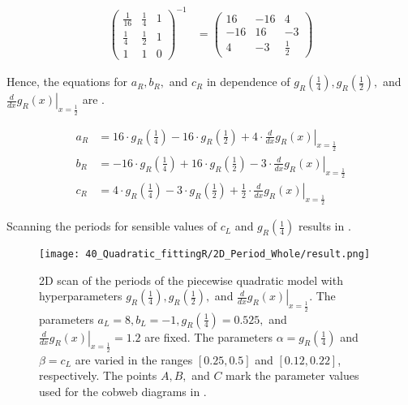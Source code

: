 \begin{align}
	\begin{pmatrix}
		\frac{1}{16} & \frac{1}{4} & 1 \\
		\frac{1}{4}  & \frac{1}{2} & 1 \\
		1            & 1           & 0
	\end{pmatrix}^{-1} & =
	\begin{pmatrix}
		16  & -16 & 4           \\
		-16 & 16  & -3          \\
		4   & -3  & \frac{1}{2}
	\end{pmatrix}
	\label{equ:setup.quad.hyper.matrix}
\end{align}

Hence, the equations for $a_R, b_R,$ and $c_R$ in dependence of $g_R\left(\frac{1}{4}\right), g_R\left(\frac{1}{2}\right),$ and $\left. \frac{d}{dx} g_R\left(x\right) \right|_{x = \frac{1}{2}}$ are .

\begin{align}
	a_R & = 16 \cdot g_R\left(\frac{1}{4}\right) - 16 \cdot g_R\left(\frac{1}{2}\right) + 4 \cdot \left. \frac{d}{dx} g_R\left(x\right) \right|_{x = \frac{1}{2}}     \label{equ:setup.quad.hyper.aR}     \\
	b_R & = -16 \cdot g_R\left(\frac{1}{4}\right) + 16 \cdot g_R\left(\frac{1}{2}\right) - 3 \cdot \left. \frac{d}{dx} g_R\left(x\right) \right|_{x = \frac{1}{2}} \label{equ:setup.quad.hyper.bR}        \\
	c_R & = 4 \cdot g_R\left(\frac{1}{4}\right) - 3 \cdot g_R\left(\frac{1}{2}\right) + \frac{1}{2} \cdot \left. \frac{d}{dx} g_R\left(x\right) \right|_{x = \frac{1}{2}} \label{equ:setup.quad.hyper.cR}
\end{align}

Scanning the periods for sensible values of $c_L$ and $g_R\left(\frac{1}{4}\right)$ results in .

\begin{figure}
	\centering
	\texttt{[image: 40\_Quadratic\_fittingR/2D\_Period\_Whole/result.png]}
	\caption[2D scan of the periods of the quadratic model with hyperparameters]{
	2D scan of the periods of the piecewise quadratic model with hyperparameters $g_R\left(\frac{1}{4}\right), g_R\left(\frac{1}{2}\right),$ and $\left. \frac{d}{dx} g_R\left(x\right) \right|_{x = \frac{1}{2}}$.
	The parameters $a_L = 8, b_L = -1, g_R\left(\frac{1}{4}\right) = 0.525,$ and $\left. \frac{d}{dx} g_R\left(x\right) \right|_{x = \frac{1}{2}} = 1.2$ are fixed.
	The parameters $\alpha = g_R\left(\frac{1}{4}\right)$ and $\beta = c_L$ are varied in the ranges $[0.25, 0.5]$ and $[0.12, 0.22]$, respectively.
	The points $A, B,$ and $C$ mark the parameter values used for the cobweb diagrams in .
	}
	\label{fig:setup.quad.hyper.period}
\end{figure}

